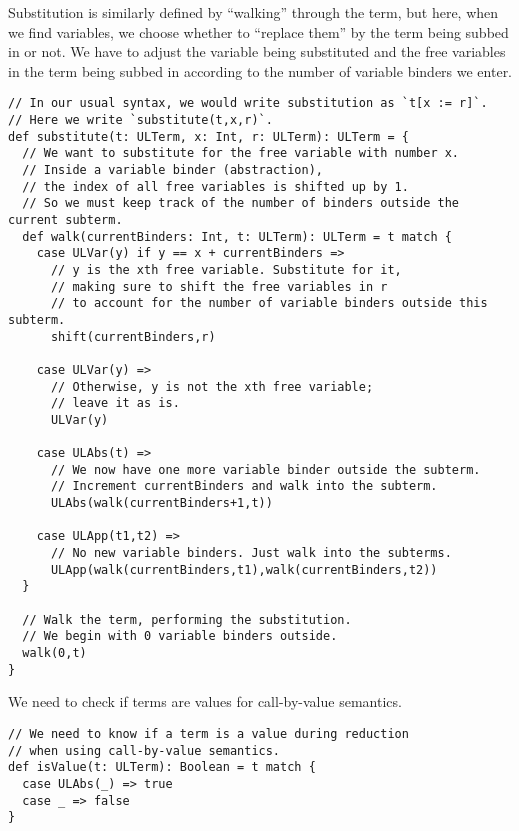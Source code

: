 \documentclass[11pt]{article}
\theoremstyle{definition}
\begin{document}
Substitution is similarly defined by “walking” through the term,
but here, when we find variables, we choose whether to “replace them”
by the term being subbed in or not.
We have to adjust the variable being substituted and the
free variables in the term being subbed in according to
the number of variable binders we enter.
\begin{verbatim}
// In our usual syntax, we would write substitution as `t[x := r]`.
// Here we write `substitute(t,x,r)`.
def substitute(t: ULTerm, x: Int, r: ULTerm): ULTerm = {
  // We want to substitute for the free variable with number x.
  // Inside a variable binder (abstraction),
  // the index of all free variables is shifted up by 1.
  // So we must keep track of the number of binders outside the current subterm.
  def walk(currentBinders: Int, t: ULTerm): ULTerm = t match {
    case ULVar(y) if y == x + currentBinders =>
      // y is the xth free variable. Substitute for it,
      // making sure to shift the free variables in r
      // to account for the number of variable binders outside this subterm.
      shift(currentBinders,r)
    
    case ULVar(y) =>
      // Otherwise, y is not the xth free variable;
      // leave it as is.
      ULVar(y)
    
    case ULAbs(t) =>
      // We now have one more variable binder outside the subterm.
      // Increment currentBinders and walk into the subterm.
      ULAbs(walk(currentBinders+1,t))

    case ULApp(t1,t2) =>
      // No new variable binders. Just walk into the subterms.
      ULApp(walk(currentBinders,t1),walk(currentBinders,t2))
  }

  // Walk the term, performing the substitution.
  // We begin with 0 variable binders outside.
  walk(0,t)
}
\end{verbatim}

We need to check if terms are values for call-by-value semantics.
\begin{verbatim}
// We need to know if a term is a value during reduction
// when using call-by-value semantics.
def isValue(t: ULTerm): Boolean = t match {
  case ULAbs(_) => true
  case _ => false
}
\end{verbatim}
\end{document}
